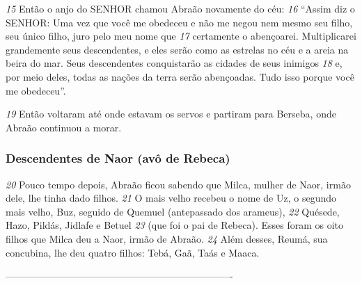 \bigskip   
\textit{\tiny 15}
Então o anjo do SENHOR chamou Abraão novamente do céu: 
\textit{\tiny 16}
“Assim diz o
SENHOR: Uma vez que você me obedeceu e não me negou nem mesmo seu filho,
seu único filho, juro pelo meu nome que 
\textit{\tiny 17}
certamente o abençoarei. Multiplicarei
grandemente seus descendentes, e eles serão como as estrelas no céu e a areia na
beira do mar. Seus descendentes conquistarão as cidades de seus inimigos 
\textit{\tiny 18}
e,
por meio deles, todas as nações da terra serão abençoadas. Tudo isso porque você
me obedeceu”.

\bigskip   
\textit{\tiny 19}
Então voltaram até onde estavam os servos e partiram para Berseba, onde
Abraão continuou a morar.

\bigskip   
\subsubsection*{Descendentes de Naor (avô de Rebeca)}
\textit{\tiny 20}
Pouco tempo depois, Abraão ficou sabendo que Milca, mulher de Naor,
irmão dele, lhe tinha dado filhos. 
\textit{\tiny 21}
O mais velho recebeu o nome de Uz, o
segundo mais velho, Buz, seguido de Quemuel (antepassado dos arameus),
\textit{\tiny 22}
Quésede, Hazo, Pildás, Jidlafe e Betuel 
\textit{\tiny 23}
(que foi o pai de Rebeca). Esses foram
os oito filhos que Milca deu a Naor, irmão de Abraão. 
\textit{\tiny 24}
Além desses, Reumá, sua
concubina, lhe deu quatro filhos: Tebá, Gaã, Taás e Maaca.

----------------------------------------------------------------------
